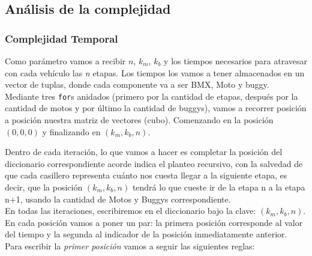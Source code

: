 \newpage

\subsection{An\'alisis de la complejidad}

\subsubsection{Complejidad Temporal}

Como par\'ametro vamos a recibir $n$, $k_m$, $k_b$ y los tiempos necesarios para atravesar con cada veh\'iculo las \emph{n} etapas. Los tiempos los vamos a tener almacenados en un vector de tuplas, donde cada componente va a ser BMX, Moto y buggy.\\

Mediante tres \texttt{for}s anidados (primero por la cantidad de etapas, despu\'es por la cantidad de motos y por \'ultimo la cantidad de buggys), vamos a recorrer posici\'on a posici\'on nuestra matriz de vectores (cubo). Comenzando en la posici\'on $(0,0,0)$ y finalizando en  $(k_{m},k_{b},n)$.

Dentro de cada iteraci\'on, lo que vamos a hacer es completar la posici\'on del diccionario correspondiente acorde indica el planteo recursivo, con la salvedad de que cada casillero representa cu\'anto nos cuesta llegar a la siguiente etapa, es decir, que la posici\'on $(k_{m},k_{b},n)$ tendr\'a lo que cueste ir de la etapa n a la etapa n+1, usando la cantidad de Motos y Buggys correspondiente.\\


En todas las iteraciones, escribiremos en el diccionario bajo la clave:  $(k{_m}, k{_b}, n)$. En cada posici\'on vamos a poner un par: la primera posici\'on corresponde al valor del tiempo y la segunda al indicador de la posici\'on inmediatamente anterior.\\

Para escribir la \emph{primer posici\'on} vamos a seguir las siguientes reglas:

